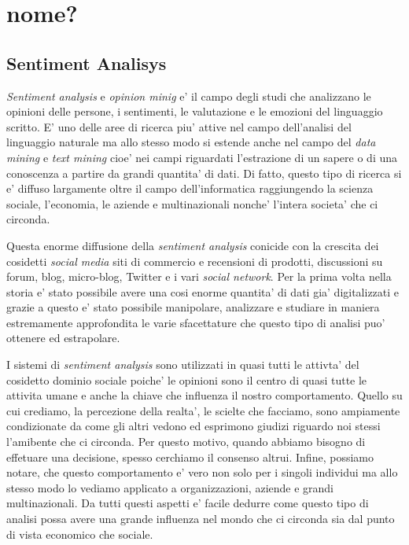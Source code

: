 \documentclass[a4paper,11pt]{book}
\theoremstyle{definition}
\begin{document}
\chapter{nome?}
\section{Sentiment Analisys}
\emph{Sentiment analysis} e \emph{opinion minig} e' il campo degli studi
che analizzano le opinioni delle persone, i sentimenti, le valutazione e le
emozioni del linguaggio scritto.
E' uno delle aree di ricerca piu' attive nel campo dell'analisi del linguaggio
naturale ma allo stesso modo si estende anche nel campo del \emph{data mining} e
\emph{text mining} cioe' nei campi riguardati l'estrazione di un sapere o di una conoscenza a partire da grandi quantita' di dati.
Di fatto, questo tipo di ricerca si e' diffuso largamente
oltre il campo dell'informatica raggiungendo la scienza sociale,
l'economia, le aziende e multinazionali nonche' l'intera societa' che ci circonda.

Questa enorme diffusione della \emph{sentiment analysis} conicide con la 
crescita dei cosidetti \emph{social media} siti di commercio e recensioni di prodotti,
discussioni su forum, blog, micro-blog, Twitter e i vari \emph{social network}.
Per la prima volta nella storia  e' stato possibile avere una
cosi enorme quantita' di dati gia' digitalizzati e grazie a questo
e' stato possibile manipolare, analizzare e studiare in maniera
estremamente approfondita le varie sfacettature che questo tipo di analisi puo'
ottenere ed estrapolare.

I sistemi di \emph{sentiment analysis} sono utilizzati in quasi tutti
le attivta' del cosidetto dominio sociale poiche' le opinioni sono il centro
di quasi tutte le attivita umane e anche la chiave che influenza il nostro 
comportamento.
Quello su cui crediamo, la percezione della realta', le scielte che facciamo,
sono ampiamente condizionate da come gli altri vedono ed esprimono giudizi
riguardo noi stessi l'amibente che ci circonda. 
Per questo motivo, quando abbiamo bisogno
di effetuare una decisione, spesso cerchiamo il consenso altrui.
Infine, possiamo notare, che questo comportamento e' vero non solo 
per i singoli individui ma allo stesso modo lo vediamo
applicato a organizzazioni, aziende e grandi multinazionali.
Da tutti questi aspetti e' facile dedurre 
come questo tipo di analisi possa avere una grande influenza nel mondo che 
ci circonda sia dal punto di vista economico che sociale.
\end{document}
